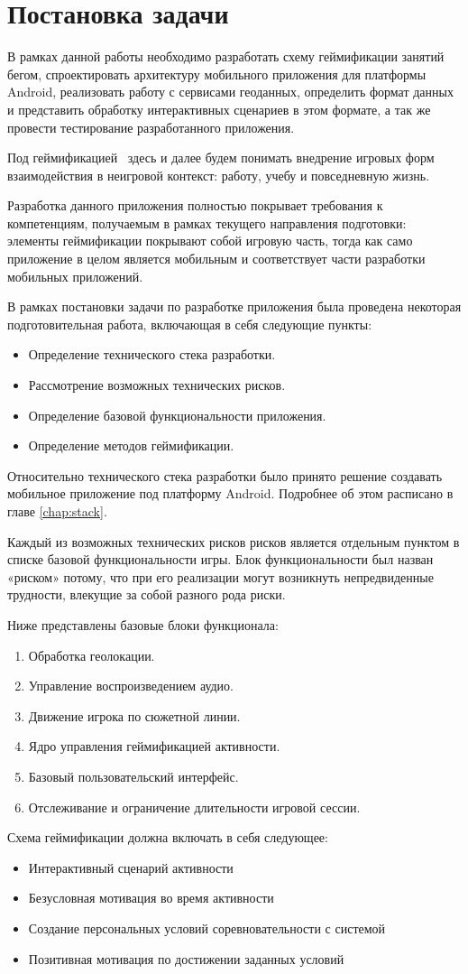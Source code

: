 \chapter{Постановка задачи}
В рамках данной работы необходимо разработать схему геймификации занятий бегом, спроектировать архитектуру мобильного приложения для платформы Android, реализовать работу с сервисами геоданных, определить формат данных и представить обработку интерактивных сценариев в этом формате, а так же провести тестирование разработанного приложения.

Под геймификацией~\autocite{gamification} здесь и далее будем понимать внедрение игровых форм взаимодействия в неигровой контекст: работу, учебу и повседневную жизнь.

Разработка данного приложения полностью покрывает требования к компетенциям, получаемым в рамках текущего направления подготовки: элементы геймификации покрывают собой игровую часть, тогда как само приложение в целом является мобильным и соответствует части разработки мобильных приложений.

В рамках постановки задачи по разработке приложения была проведена некоторая подготовительная работа, включающая в себя следующие пункты:
\begin{itemize}
	\item Определение технического стека разработки.
	\item Рассмотрение возможных технических рисков.
	\item Определение базовой функциональности приложения.
	\item Определение методов геймификации.
\end{itemize}

Относительно технического стека разработки было принято решение создавать мобильное приложение под платформу Android. Подробнее об этом расписано в главе \autoref{chap:stack}.


Каждый из возможных технических рисков рисков является отдельным пунктом в списке базовой функциональности игры. Блок функциональности был назван «риском» потому, что при его реализации могут возникнуть непредвиденные трудности, влекущие за собой разного рода риски.

Ниже представлены базовые блоки функционала:
\begin{enumerate}
	\item Обработка геолокации.
	\item Управление воспроизведением аудио.
	\item Движение игрока по сюжетной линии.
	\item Ядро управления геймификацией активности.
	\item Базовый пользовательский интерфейс.
	\item Отслеживание и ограничение длительности игровой сессии.
\end{enumerate}

Схема геймификации должна включать в себя следующее:
\begin{itemize}
	\item Интерактивный сценарий активности
	\item Безусловная мотивация во время активности
	\item Создание персональных условий соревновательности с системой
	\item Позитивная мотивация по достижении заданных условий
\end{itemize}